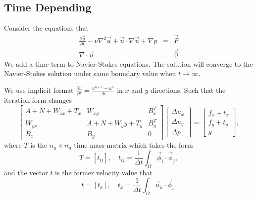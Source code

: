 \documentclass[a4paper]{article}
\begin{document}
\subsection{Time Depending}
Consider the equations that
\begin{equation}
\begin{array}{rcl}
\frac{\partial \vec{u}}{\partial t} - \nu \nabla^2 \vec{u} + \vec{u} \cdot \nabla \vec{u} + \nabla p & = & \vec{F} \\
\nabla \cdot \vec{u} & = & \vec{0}
\label{eq::Timedepending-problem}
\end{array}
\end{equation}
We add a time term to Navier-Stokes equations. The solution will converge to the Navier-Stokes solution under same boundary value when $t \to \infty$.


We use implicit format $\frac{\partial u}{\partial t} = \frac{u^{n + 1}-u^{n}}{\Delta t}$ in $x$ and $y$ directions.
Such that the iteration form changes
\begin{equation}
\left[ \begin{array}{ccc}
A + N + W_{xx} + T_x & W_{xy} & B_x^T \\
W_{yx} & A + N + W{_yy} + T_y& B_y^T \\
B_x & B_y & 0
\end{array}
\right]
\left[\begin{array}{ccc}
\Delta u_x\\
\Delta u_y\\
\Delta p
\end{array}
\right] =
\left[\begin{array}{ccc}
f_x + t_x\\
f_y + t_y\\
g
\end{array}
\right],
\label{Timedepending}
\end{equation}
where $T$ is the $n_u\times n_u$ time mass-matrix which takes the form
\begin{equation}
T = [t_{ij}],\quad t_{ij}=\frac{1}{\Delta t}\int_{\Omega}\vec{\phi}_i\cdot\vec{\phi}_j,
\end{equation}
and the vector $t$ is the former velocity value that
\begin{equation}
t = [t_{k}],\quad t_{k}=\frac{1}{\Delta t}\int_{\Omega}\vec{u}_h\cdot\vec{\phi}_i.
\end{equation}
\\
\end{document}
